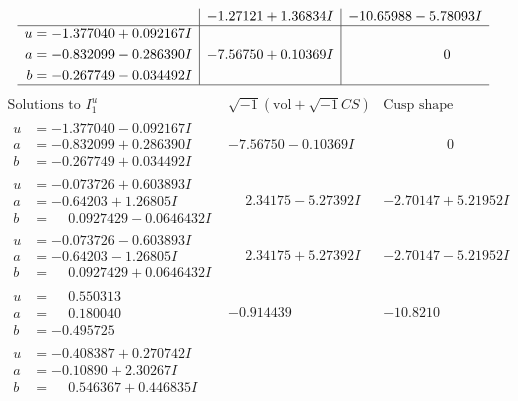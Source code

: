 \documentclass[1p]{elsarticle_modified}
\theoremstyle{definition}
\newcommand{\I}{\sqrt{-1}}
\begin{document}
$$\begin{array}{c|c|c}
 & -1.27121 + 1.36834 I & -10.65988 - 5.78093 I \\ \hline\begin{aligned}
u &= -1.377040 + 0.092167 I \\
a &= -0.832099 - 0.286390 I \\
b &= -0.267749 - 0.034492 I\end{aligned}
 & -7.56750 + 0.10369 I & \phantom{-0.000000 } 0\\
 \hline 
 \end{array}$$\newpage$$\begin{array}{c|c|c}  
\text{Solutions to }I^u_{1}& \I (\text{vol} + \sqrt{-1}CS) & \text{Cusp shape}\\
 \hline 
\begin{aligned}
u &= -1.377040 - 0.092167 I \\
a &= -0.832099 + 0.286390 I \\
b &= -0.267749 + 0.034492 I\end{aligned}
 & -7.56750 - 0.10369 I & \phantom{-0.000000 } 0 \\ \hline\begin{aligned}
u &= -0.073726 + 0.603893 I \\
a &= -0.64203 + 1.26805 I \\
b &= \phantom{-}0.0927429 - 0.0646432 I\end{aligned}
 & \phantom{-}2.34175 - 5.27392 I & -2.70147 + 5.21952 I \\ \hline\begin{aligned}
u &= -0.073726 - 0.603893 I \\
a &= -0.64203 - 1.26805 I \\
b &= \phantom{-}0.0927429 + 0.0646432 I\end{aligned}
 & \phantom{-}2.34175 + 5.27392 I & -2.70147 - 5.21952 I \\ \hline\begin{aligned}
u &= \phantom{-}0.550313\phantom{ +0.000000I} \\
a &= \phantom{-}0.180040\phantom{ +0.000000I} \\
b &= -0.495725\phantom{ +0.000000I}\end{aligned}
 & -0.914439\phantom{ +0.000000I} & -10.8210\phantom{ +0.000000I} \\ \hline\begin{aligned}
u &= -0.408387 + 0.270742 I \\
a &= -0.10890 + 2.30267 I \\
b &= \phantom{-}0.546367 + 0.446835 I\end{aligned}

\end{array}$$
\end{document}
